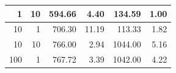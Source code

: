 \documentclass[12pt,a4paper]{report}
\begin{document}
\begin{table}[H]
\begin{tabular}{|r|r|r|r|r|r|}
1                                                                                                & 10                                                                                                                         & 594.66                                                                                                                                          & 4.40                                                                                                                             & 134.59                                                                                                   & 1.00                                                                                                                             \\ \hline
10                                                                                               & 1                                                                                                                          & 706.30                                                                                                                                          & 11.19                                                                                                                            & 113.33                                                                                                   & 1.82                                                                                                                             \\ \hline
10                                                                                               & 10                                                                                                                         & 766.00                                                                                                                                          & 2.94                                                                                                                             & 1044.00                                                                                                  & 5.16                                                                                                                             \\ \hline
100                                                                                              & 1                                                                                                                          & 767.72                                                                                                                                          & 3.39                                                                                                                             & 1042.00                                                                                                  & 4.22                                                                                                                             \\ \hline

\end{tabular}
\end{table}
\end{document}
